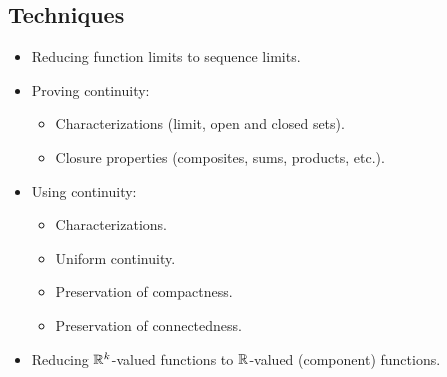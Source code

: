\subsection*{Techniques}
\begin{itemize}[itemsep=0pt]
\item Reducing function limits to sequence limits.
\item Proving continuity:
\begin{itemize}[itemsep=0pt]
\item Characterizations (limit, open and closed sets).
\item Closure properties (composites, sums, products, etc.).
\end{itemize}
\item Using continuity:
\begin{itemize}[itemsep=0pt]
\item Characterizations.
\item Uniform continuity.
\item Preservation of compactness.
\item Preservation of connectedness.
\end{itemize}
\item Reducing \(\mathbb{R}^k\)-valued functions to \(\mathbb{R}\)-valued (component) functions.
\end{itemize}

